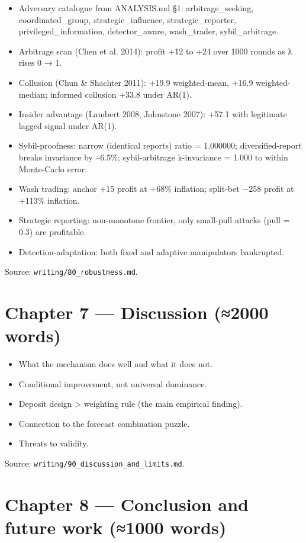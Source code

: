 \documentclass[11pt,a4paper,openany]{report}
\begin{document}
\begin{itemize}
  \item Adversary catalogue from ANALYSIS.md §1: arbitrage\_seeking,
    coordinated\_group, strategic\_influence, strategic\_reporter,
    privileged\_information, detector\_aware, wash\_trader,
    sybil\_arbitrage.
  \item Arbitrage scan (Chen et al. 2014): profit +12 to +24 over 1000
    rounds as λ rises 0 → 1.
  \item Collusion (Chun \& Shachter 2011): +19.9 weighted-mean, +16.9
    weighted-median; informed collusion +33.8 under AR(1).
  \item Insider advantage (Lambert 2008; Johnstone 2007): +57.1 with
    legitimate lagged signal under AR(1).
  \item Sybil-proofness: narrow (identical reports) ratio = 1.000000;
    diversified-report breaks invariance by \textasciitilde{}6.5\%; sybil-arbitrage
    k-invariance = 1.000 to within Monte-Carlo error.
  \item Wash trading: anchor +15 profit at +68\% inflation;
    split-bet −258 profit at +113\% inflation.
  \item Strategic reporting: non-monotone frontier, only small-pull
    attacks (pull = 0.3) are profitable.
  \item Detection-adaptation: both fixed and adaptive manipulators
    bankrupted.
\end{itemize}

Source: \texttt{writing/80\_robustness.md}.

\section{Chapter 7 — Discussion (≈2000 words)}

\begin{itemize}
  \item What the mechanism does well and what it does not.
  \item Conditional improvement, not universal dominance.
  \item Deposit design > weighting rule (the main empirical finding).
  \item Connection to the forecast combination puzzle.
  \item Threats to validity.
\end{itemize}

Source: \texttt{writing/90\_discussion\_and\_limits.md}.

\section{Chapter 8 — Conclusion and future work (≈1000 words)}
\end{document}
